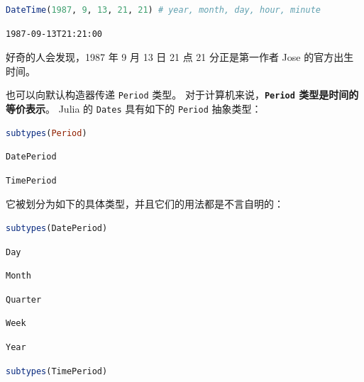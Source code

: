 \documentclass[
  notoc %
]{tufte-book}
\newcommand{\passthrough}[1]{#1}
\begin{document}
\begin{lstlisting}[language=Julia]
DateTime(1987, 9, 13, 21, 21) # year, month, day, hour, minute
\end{lstlisting}

\begin{lstlisting}[language=Output]
1987-09-13T21:21:00
\end{lstlisting}

好奇的人会发现，1987 年 9 月 13 日 21 点 21 分正是第一作者 Jose
的官方出生时间。

也可以向默认构造器传递 \passthrough{\lstinline!Period!} 类型。
对于计算机来说，\textbf{\passthrough{\lstinline!Period!}
类型是时间的等价表示}。 Julia 的 \passthrough{\lstinline!Dates!}
具有如下的 \passthrough{\lstinline!Period!} 抽象类型：

\begin{lstlisting}[language=Julia]
subtypes(Period)
\end{lstlisting}

\begin{lstlisting}[language=Output]
DatePeriod
\end{lstlisting}

\begin{lstlisting}[language=Output]
TimePeriod
\end{lstlisting}

它被划分为如下的具体类型，并且它们的用法都是不言自明的：

\begin{lstlisting}[language=Julia]
subtypes(DatePeriod)
\end{lstlisting}

\begin{lstlisting}[language=Output]
Day
\end{lstlisting}

\begin{lstlisting}[language=Output]
Month
\end{lstlisting}

\begin{lstlisting}[language=Output]
Quarter
\end{lstlisting}

\begin{lstlisting}[language=Output]
Week
\end{lstlisting}

\begin{lstlisting}[language=Output]
Year
\end{lstlisting}

\begin{lstlisting}[language=Julia]
subtypes(TimePeriod)
\end{lstlisting}
\end{document}
